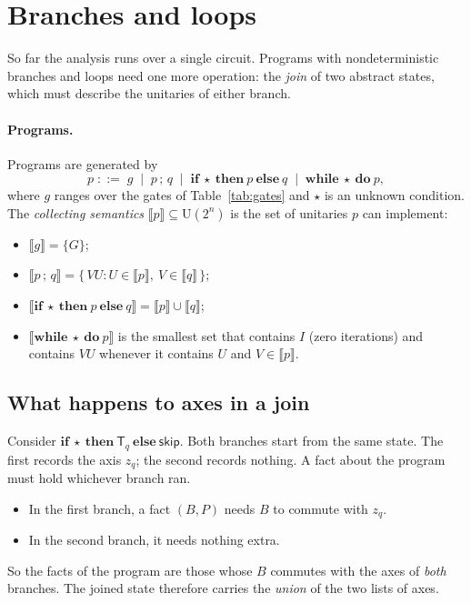 \documentclass[11pt]{article}
\theoremstyle{definition}
\theoremstyle{remark}
\newcommand{\Unit}{\mathrm{U}(2^n)}
\newcommand{\sem}[1]{\llbracket #1 \rrbracket}
\newcommand{\gate}[1]{\mathsf{#1}}
\begin{document}
\section{Branches and loops}\label{sec:loops}

So far the analysis runs over a single circuit. Programs with nondeterministic branches
and loops need one more operation: the \emph{join} of two abstract states, which must
describe the unitaries of either branch.

\paragraph{Programs.}
Programs are generated by
\[
  p \;::=\; g \;\mid\; p\,;\,q \;\mid\; \textbf{if}\ \star\ \textbf{then}\ p\ \textbf{else}\ q
  \;\mid\; \textbf{while}\ \star\ \textbf{do}\ p ,
\]
where $g$ ranges over the gates of Table~\ref{tab:gates} and $\star$ is an unknown
condition. The \emph{collecting semantics} $\sem{p} \subseteq \Unit$ is the set of unitaries
$p$ can implement:
\begin{itemize}[nosep]
  \item $\sem{g} = \{G\}$;
  \item $\sem{p\,;\,q} = \{\,VU : U \in \sem{p},\ V \in \sem{q}\,\}$;
  \item $\sem{\textbf{if}\ \star\ \textbf{then}\ p\ \textbf{else}\ q} = \sem{p} \cup \sem{q}$;
  \item $\sem{\textbf{while}\ \star\ \textbf{do}\ p}$ is the smallest set that contains $I$
  (zero iterations) and contains $VU$ whenever it contains $U$ and $V \in \sem{p}$.
\end{itemize}

\subsection{What happens to axes in a join}

Consider $\textbf{if}\ \star\ \textbf{then}\ \gate T_q\ \textbf{else}\ \mathsf{skip}$. Both
branches start from the same state. The first records the axis $z_q$; the second records
nothing. A fact about the program must hold whichever branch ran.
\begin{itemize}[nosep]
  \item In the first branch, a fact $(B, P)$ needs $B$ to commute with $z_q$.
  \item In the second branch, it needs nothing extra.
\end{itemize}
So the facts of the program are those whose $B$ commutes with the axes of \emph{both}
branches. The joined state therefore carries the \emph{union} of the two lists of axes.
\end{document}
